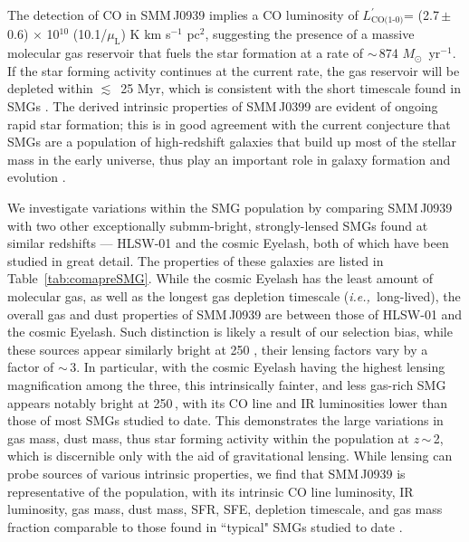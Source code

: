 \documentclass[twocolumn,apj,numberedappendix]{emulateapj}
\newcommand{\Msun}{\mbox{$M_{\odot}$}}
\newcommand{\Lp}{\mbox{$L^{\prime}_\textrm{CO(1-0)}$}}
\newcommand{\LpU}{\mbox{K\,\,km\,\,s$^{-1}$\,\,pc$^2$}}
\newcommand{\eg}{{\sl e.g.,~}}
\newcommand{\ie}{{\sl i.e.,~}}
\newcommand{\pmOne}{\mbox{$^{-1}$}}
\begin{document}
The detection of CO in SMM\,J0939 
implies a CO luminosity of \Lp = (2.7\,$\pm$\,0.6) $\times$ 10$^{10}$ (10.1/$\mu_\textrm{L}$) \LpU, suggesting the presence of a massive 
molecular gas reservoir that fuels the star formation at a rate of $\sim$\,874 \Msun~yr\pmOne. If the star forming activity continues at the current rate, the gas reservoir will be depleted within $\lesssim$~25 Myr, 
which is consistent with the short timescale found in SMGs \citep{Greve05a}. The derived intrinsic properties of SMM\,J0399 are evident of ongoing rapid star formation; this is in good agreement with the current conjecture that SMGs are a 
population of high-redshift galaxies that build up most of the stellar mass in the early universe, thus play an important role 
in galaxy formation and evolution \citep[\eg ][]{Micha10a}. 

We investigate variations within the SMG population by comparing SMM\,J0939 with two other exceptionally submm-bright, 
strongly-lensed SMGs
found at similar redshifts --- HLSW-01 and the cosmic Eyelash, both of which have been studied in great detail. The properties 
of these galaxies are listed in Table~\ref{tab:comapreSMG}. While the cosmic Eyelash has the least amount of molecular gas, as well as 
the 
longest gas depletion timescale (\ie long-lived), the overall gas and dust properties of SMM\,J0939 are between those of HLSW-01 and the 
cosmic
Eyelash. Such distinction is likely a result of our selection bias, while these sources appear similarly bright at 250 \micron, their lensing factors 
vary by a factor of $\sim$\,3. In particular, with the cosmic Eyelash having the highest lensing magnification among the 
three, this
intrinsically fainter, and less gas-rich SMG appears notably bright 
at 250\,\micron, with its CO line and IR luminosities lower than those of most SMGs studied to date. 
This demonstrates 
the large variations in gas mass, dust mass, thus star forming activity within the population at $z$\,$\sim$\,2, which is discernible only
 with the aid of gravitational lensing. 
While lensing can probe sources 
of various intrinsic properties, we find that SMM\,J0939 is representative of the population, with its intrinsic CO line luminosity, IR luminosity, gas mass, 
dust mass, SFR, SFE, depletion timescale, and gas mass fraction comparable to those found in ``typical" SMGs studied to date 
\citep[\eg ][]{Greve05a,Tacconi10a}.
\end{document}
